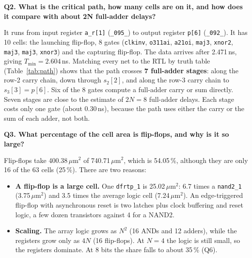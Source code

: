 \documentclass[10pt,a4paper,twocolumn]{article}
\newcommand{\umsq}{\,$\mu$m$^2$}
\newcommand{\q}[1]{\par\smallskip\noindent\textbf{#1}\par}
\begin{document}
\q{Q2. What is the critical path, how many cells are on it, and how does it compare with about 2N full-adder delays?}
It runs from input register \texttt{a\_r[1]} (\texttt{\_095\_}) to output register \texttt{p[6]} (\texttt{\_092\_}). It has 10 cells: the launching flip-flop, 8 gates (\texttt{clkinv}, \texttt{o311ai}, \texttt{a21oi}, \texttt{maj3}, \texttt{xnor2}, \texttt{maj3}, \texttt{maj3}, \texttt{xnor3}) and the capturing flip-flop. The data arrives after 2.471\,ns, giving $T_{\min} = 2.604$\,ns. Matching every net to the RTL by truth table (Table~\ref{tab:path}) shows that the path crosses \textbf{7 full-adder stages}: along the row-2 carry chain, down through $s_2[2]$, and along the row-3 carry chain to $s_3[3] = p[6]$. Six of the 8 gates compute a full-adder carry or sum directly. Seven stages are close to the estimate of $2N = 8$ full-adder delays. Each stage costs only one gate (about 0.30\,ns), because the path uses either the carry or the sum of each adder, not both.

\q{Q3. What percentage of the cell area is flip-flops, and why is it so large?}
Flip-flops take 400.38\umsq{} of 740.71\umsq{}, which is 54.05\,\%, although they are only 16 of the 63 cells (25\,\%). There are two reasons:
\begin{itemize}
  \item \textbf{A flip-flop is a large cell.} One \texttt{dfrtp\_1} is 25.02\umsq: 6.7 times a \texttt{nand2\_1} (3.75\umsq) and 3.5 times the average logic cell (7.24\umsq). An edge-triggered flip-flop with asynchronous reset is two latches plus clock buffering and reset logic, a few dozen transistors against 4 for a NAND2.
  \item \textbf{Scaling.} The array logic grows as $N^2$ (16 ANDs and 12 adders), while the registers grow only as $4N$ (16 flip-flops). At $N = 4$ the logic is still small, so the registers dominate. At 8 bits the share falls to about 35\,\% (Q6).
\end{itemize}
\end{document}
